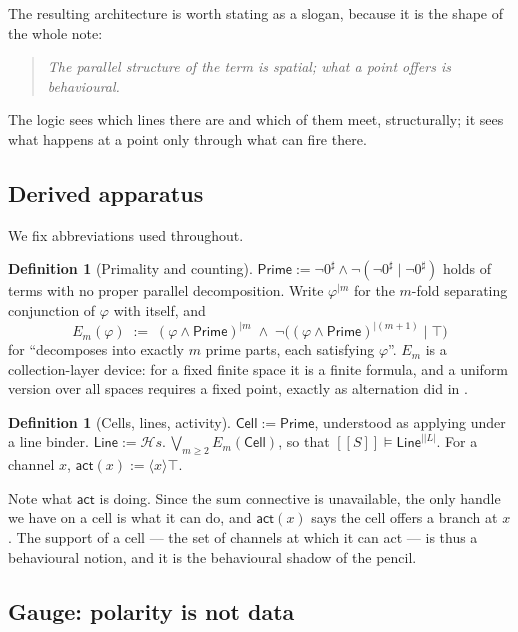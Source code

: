 \documentclass[11pt]{article}
\theoremstyle{plain}
\theoremstyle{definition}
\newtheorem{definition}[theorem]{Definition}
\newcommand{\enc}[1]{[\![#1]\!]}
\newcommand{\bmid}{\mathbin{|}}
\newcommand{\Cell}{\mathsf{Cell}}
\newcommand{\Prime}{\mathsf{Prime}}
\newcommand{\Line}{\mathsf{Line}}
\newcommand{\act}{\mathsf{act}}
\begin{document}
The resulting architecture is worth stating as a slogan, because it is the shape of the whole note:
\begin{quote}
\emph{The parallel structure of the term is spatial; what a point offers is behavioural.}
\end{quote}
The logic sees which lines there are and which of them meet, structurally; it sees what happens at a
point only through what can fire there.

\subsection{Derived apparatus}

We fix abbreviations used throughout.

\begin{definition}[Primality and counting]
$\Prime := \neg 0^\sharp \wedge \neg(\neg 0^\sharp \bmid \neg 0^\sharp)$ holds of terms with no
proper parallel decomposition. Write $\varphi^{\bmid m}$ for the $m$-fold separating conjunction of
$\varphi$ with itself, and
\[
E_m(\varphi) \;:=\; (\varphi \wedge \Prime)^{\bmid m} \;\wedge\;
\neg\bigl( (\varphi \wedge \Prime)^{\bmid (m+1)} \bmid \top \bigr)
\]
for ``decomposes into exactly $m$ prime parts, each satisfying $\varphi$''. $E_m$ is a
collection-layer device: for a fixed finite space it is a finite formula, and a uniform version
over all spaces requires a fixed point, exactly as alternation did in \cite[Rem.~4]{Classifier}.
\end{definition}

\begin{definition}[Cells, lines, activity]
$\Cell := \Prime$, understood as applying under a line binder.
$\Line := \mathcal{H}s.\, \bigvee_{m \geq 2} E_m(\Cell)$, so that $\enc{S} \models \Line^{\bmid |L|}$.
For a channel $x$, $\act(x) := \langle x \rangle \top$.
\end{definition}

Note what $\act$ is doing. Since the sum connective is unavailable, the only handle we have on a
cell is what it can do, and $\act(x)$ says the cell offers a branch at $x$. The support of a cell
--- the set of channels at which it can act --- is thus a behavioural notion, and it is the
behavioural shadow of the pencil.

\subsection{Gauge: polarity is not data}
\label{sec:gauge}
\end{document}
